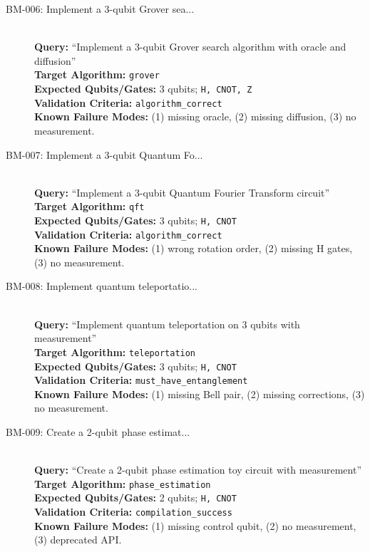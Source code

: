 \begin{description}
    \item[BM-006: Implement a 3-qubit Grover sea...] \ \\
    \textbf{Query:} ``Implement a 3-qubit Grover search algorithm with oracle and diffusion'' \\
    \textbf{Target Algorithm:} \texttt{grover} \\
    \textbf{Expected Qubits/Gates:} 3 qubits; \texttt{H, CNOT, Z} \\
    \textbf{Validation Criteria:} \texttt{algorithm\_correct} \\
    \textbf{Known Failure Modes:} (1) missing oracle, (2) missing diffusion, (3) no measurement.

    \item[BM-007: Implement a 3-qubit Quantum Fo...] \ \\
    \textbf{Query:} ``Implement a 3-qubit Quantum Fourier Transform circuit'' \\
    \textbf{Target Algorithm:} \texttt{qft} \\
    \textbf{Expected Qubits/Gates:} 3 qubits; \texttt{H, CNOT} \\
    \textbf{Validation Criteria:} \texttt{algorithm\_correct} \\
    \textbf{Known Failure Modes:} (1) wrong rotation order, (2) missing H gates, (3) no measurement.

    \item[BM-008: Implement quantum teleportatio...] \ \\
    \textbf{Query:} ``Implement quantum teleportation on 3 qubits with measurement'' \\
    \textbf{Target Algorithm:} \texttt{teleportation} \\
    \textbf{Expected Qubits/Gates:} 3 qubits; \texttt{H, CNOT} \\
    \textbf{Validation Criteria:} \texttt{must\_have\_entanglement} \\
    \textbf{Known Failure Modes:} (1) missing Bell pair, (2) missing corrections, (3) no measurement.

    \item[BM-009: Create a 2-qubit phase estimat...] \ \\
    \textbf{Query:} ``Create a 2-qubit phase estimation toy circuit with measurement'' \\
    \textbf{Target Algorithm:} \texttt{phase\_estimation} \\
    \textbf{Expected Qubits/Gates:} 2 qubits; \texttt{H, CNOT} \\
    \textbf{Validation Criteria:} \texttt{compilation\_success} \\
    \textbf{Known Failure Modes:} (1) missing control qubit, (2) no measurement, (3) deprecated API.


\end{description}
